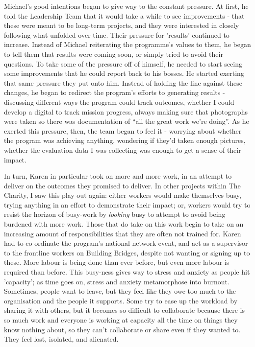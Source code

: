 Michael’s good intentions began to give way to the constant pressure. At first, he told the Leadership Team that it would take a while to see improvements - that these were meant to be long-term projects, and they were interested in closely following what unfolded over time. Their pressure for 'results' continued to increase. Instead of Michael reiterating the programme's values to them, he began to tell them that results were coming soon, or simply tried to avoid their questions. To take some of the pressure off of himself, he needed to start seeing some improvements that he could report back to his bosses. He started exerting that same pressure they put onto him. Instead of holding the line against these changes, he began to redirect the program’s efforts to generating results - discussing different ways the program could track outcomes, whether I could develop a digital to track mission progress, always making sure that photographs were taken so there was documentation of “all the great work we’re doing”. As he exerted this pressure, then, the team began to feel it - worrying about whether the program was achieving anything, wondering if they’d taken enough pictures, whether the evaluation data I was collecting was enough to get a sense of their impact.

In turn, Karen in particular took on more and more work, in an attempt to deliver on the outcomes they promised to deliver. In other projects within The Charity, I saw this play out again: either workers would make themselves busy, trying anything in an effort to demonstrate their impact; or, workers would try to resist the horizon of busy-work by \emph{looking} busy to attempt to avoid being burdened with more work. Those that do take on this work begin to take on an increasing amount of responsibilities that they are often not trained for. Karen had to co-ordinate the program’s national network event, and act as a supervisor to the frontline workers on Building Bridges, despite not wanting or signing up to these. More labour is being done than ever before, but even more labour is required than before. This busy-ness gives way to stress and anxiety as people hit 'capacity'; as time goes on, stress and anxiety metamorphose into burnout. Sometimes, people want to leave, but they feel like they owe too much to the organisation and the people it supports. Some try to ease up the workload by sharing it with others, but it becomes so difficult to collaborate because there is so much work and everyone is working at capacity all the time on things they know nothing about, so they can’t collaborate or share even if they wanted to. They feel lost, isolated, and alienated.


